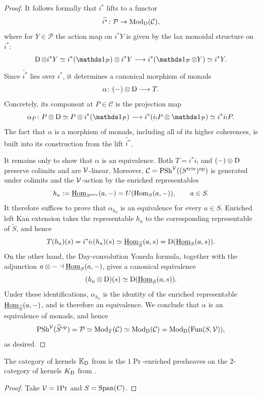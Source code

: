 \documentclass[11pt]{book}
\begin{document}
\begin{proof}
		It follows formally that $i^*$ lifts to a functor
		\[
			\widetilde{i^*}\colon \mathcal P\to{\textup{Mod}}_{\operatorname{\mathrm{D}}}(\mathcal C),
		\]
		where for $Y\in\mathcal P$ the action map on $i^*Y$ is given by the lax monoidal structure on $i^*$:
		\[
			\D\otimes i^*Y
			\simeq i^*(\unit_{\mathcal P})\otimes i^*Y
			\longrightarrow i^*(\unit_{\mathcal P}\otimes Y)
			\simeq i^*Y.
		\]
		Since $\widetilde{i^*}$ lies over $i^*$, it determines a canonical morphism of monads
		\[
			\alpha\colon (-)\otimes\operatorname{\mathrm{D}}\longrightarrow T.
		\]
		Concretely, its component at $P\in\mathcal C$ is the projection map
		\[
			\alpha_P\colon
			P\otimes\D
			\simeq P\otimes i^*(\unit_{\mathcal P})
			\longrightarrow i^*(i_!P\otimes\unit_{\mathcal P})
			\simeq i^*i_!P.
		\]
		The fact that $\alpha$ is a morphism of monads, including all of its higher coherences, is built into its construction from the lift $\widetilde{i^*}$.

		It remains only to show that $\alpha$ is an equivalence. Both $T=i^*i_!$ and $(-)\otimes\operatorname{\mathrm{D}}$ preserve colimits and are $\mathcal{V}$-linear. Moreover, $\mathcal C=\operatorname{PSh}^{\mathcal{V}}((S^{\mathrm{triv}})^{\textup{op}})$ is generated under colimits and the $\mathcal{V}$-action by the enriched representables
		\[
			h_a:=\operatorname{\underline{\operatorname{Hom}}}_{S^{\mathrm{triv}}}(a,-)=U(\operatorname{Hom}_S(a,-)), \qquad a\in S.
		\]
		It therefore suffices to prove that $\alpha_{h_a}$ is an equivalence for every $a\in S$. Enriched left Kan extension takes the representable $h_a$ to the corresponding representable of $\widetilde S$, and hence
		\[
			T(h_a)(s)=i^*i_!(h_a)(s)\simeq\operatorname{\underline{\operatorname{Hom}}}_{\widetilde S}(a,s)=\operatorname{\mathrm{D}}(\operatorname{\underline{\operatorname{Hom}}}_S(a,s)).
		\]
		On the other hand, the Day-convolution Yoneda formula, together with the adjunction $a\otimes-\dashv\operatorname{\underline{\operatorname{Hom}}}_S(a,-)$, gives a canonical equivalence
		\[
			(h_a\otimes\operatorname{\mathrm{D}})(s)\simeq\operatorname{\mathrm{D}}(\operatorname{\underline{\operatorname{Hom}}}_S(a,s)).
		\]
		Under these identifications, $\alpha_{h_a}$ is the identity of the enriched representable $\operatorname{\underline{\operatorname{Hom}}}_{\widetilde S}(a,-)$, and is therefore an equivalence. We conclude that $\alpha$ is an equivalence of monads, and hence
		\[
			\operatorname{PSh}^{\mathcal{V}}(\widetilde S^{\textup{op}})
			=\mathcal P
			\simeq {\textup{Mod}}_T(\mathcal C)
			\simeq {\textup{Mod}}_{\operatorname{\mathrm{D}}}(\mathcal C)
			={\textup{Mod}}_{\operatorname{\mathrm{D}}}(\operatorname{Fun}(S,\mathcal{V})),
		\]
		as desired.
	\end{proof}

	\begin{corollary}
		The category of kernels $\mathbb{K}_{\operatorname{\mathrm{D}}}$ from  is the $1\Pr$-enriched presheaves on the 2-category of kernels $K_{\operatorname{\mathrm{D}}}$ from .
	\end{corollary}
	\begin{proof}
		Take $\mathcal{V} = 1\textup{Pr}$ and $S = \operatorname{Span}(C)$.
	\end{proof}
\end{document}
